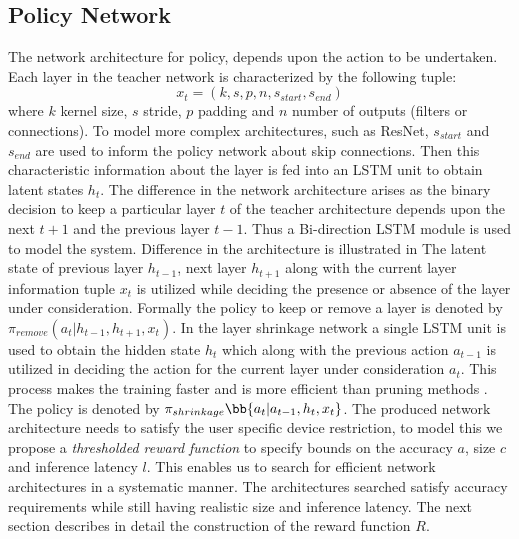 \documentclass[../main]{subfiles}
\begin{document}
    \subsection{Policy Network}
        \label{sec:num1}
        The network architecture for policy, depends upon the action to be undertaken.
        Each layer in the teacher network is characterized by the following tuple:
        \begin{equation}
            x_{t} = (k, s, p, n, s_{start}, s_{end})
        \end{equation}
        where $k$ kernel size, $s$ stride, $p$ padding and $n$ number of outputs (filters or connections).
        To model more complex architectures, such as ResNet, $s_{start}$ and $s_{end}$ are used to inform the policy network about skip connections.
        Then this characteristic information about the layer is fed into an LSTM unit to obtain latent states $h_{t}$.
        The difference in the network architecture arises as the binary decision to keep a particular layer $t$ of the teacher architecture depends upon the next $t+1$ and the previous layer $t-1$.
        Thus a Bi-direction LSTM module is used to model the system.
        Difference in the architecture is illustrated in %
        The latent state of previous layer $h_{t-1}$, next layer $h_{t+1}$ along with the current layer information tuple $x_{t}$ is utilized while deciding the presence or absence of the layer under consideration.
        Formally the policy to keep or remove a layer is denoted by $\pi_{remove}(a_{t}|h_{t-1}, h_{t+1}, x_{t})$.
        In the layer shrinkage network a single LSTM unit is used to obtain the hidden state $h_{t}$ which along with the previous action $a_{t-1}$ is utilized in deciding the action for the current layer under consideration $a_{t}$.
        This process makes the training faster and is more efficient than pruning methods \cite{srinivas2015data,guo2016dynamic,anwar2017structured}.
        The policy is denoted by $\pi_{shrinkage}\bb{a_{t}|a_{t-1}, h_{t}, x_{t}}$.
        The produced network architecture needs to satisfy the user specific device restriction, to model this we propose a \textit{thresholded reward function} to specify bounds on the accuracy $a$, size $c$ and inference latency $l$.
        This enables us to search for efficient network architectures in a systematic manner.
        The architectures searched satisfy accuracy requirements while still having realistic size and inference latency.
        The next section describes in detail the construction of the reward function $R$.
\end{document}
